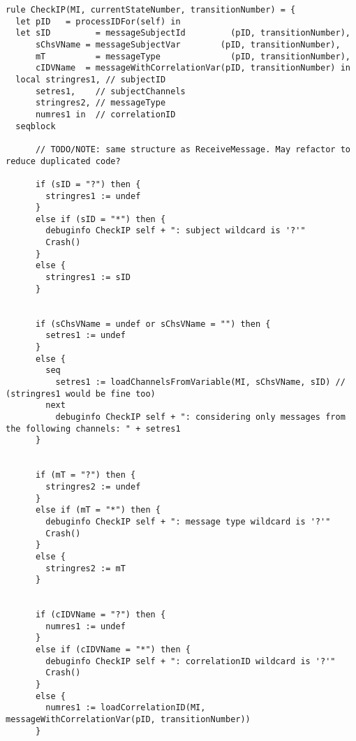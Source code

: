 \begin{listing}[H]
\begin{verbatim}
rule CheckIP(MI, currentStateNumber, transitionNumber) = {
  let pID   = processIDFor(self) in
  let sID         = messageSubjectId         (pID, transitionNumber),
      sChsVName = messageSubjectVar        (pID, transitionNumber),
      mT          = messageType              (pID, transitionNumber),
      cIDVName  = messageWithCorrelationVar(pID, transitionNumber) in
  local stringres1, // subjectID
      setres1,    // subjectChannels
      stringres2, // messageType
      numres1 in  // correlationID
  seqblock

      // TODO/NOTE: same structure as ReceiveMessage. May refactor to reduce duplicated code?

      if (sID = "?") then {
        stringres1 := undef
      }
      else if (sID = "*") then {
        debuginfo CheckIP self + ": subject wildcard is '?'"
        Crash()
      }
      else {
        stringres1 := sID
      }


      if (sChsVName = undef or sChsVName = "") then {
        setres1 := undef
      }
      else {
        seq
          setres1 := loadChannelsFromVariable(MI, sChsVName, sID) // (stringres1 would be fine too)
        next
          debuginfo CheckIP self + ": considering only messages from the following channels: " + setres1
      }


      if (mT = "?") then {
        stringres2 := undef
      }
      else if (mT = "*") then {
        debuginfo CheckIP self + ": message type wildcard is '?'"
        Crash()
      }
      else {
        stringres2 := mT
      }


      if (cIDVName = "?") then {
        numres1 := undef
      }
      else if (cIDVName = "*") then {
        debuginfo CheckIP self + ": correlationID wildcard is '?'"
        Crash()
      }
      else {
        numres1 := loadCorrelationID(MI, messageWithCorrelationVar(pID, transitionNumber))
      }



\end{verbatim}
\end{listing}
